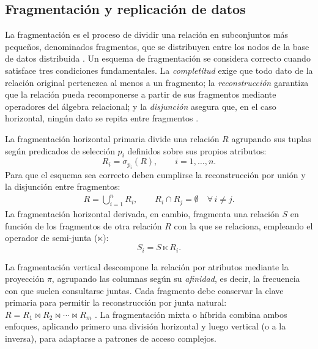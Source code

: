 \documentclass[10pt,a4paper]{article}
\begin{document}
\subsection{Fragmentación y replicación de datos}

La fragmentación es el proceso de dividir una relación en subconjuntos más pequeños,
denominados fragmentos, que se distribuyen entre los nodos de la base de datos
distribuida \cite{ozsu2020}. Un esquema de fragmentación se considera correcto cuando
satisface tres condiciones fundamentales. La \emph{completitud} exige que todo dato de
la relación original pertenezca al menos a un fragmento; la \emph{reconstrucción}
garantiza que la relación pueda recomponerse a partir de sus fragmentos mediante
operadores del álgebra relacional; y la \emph{disjunción} asegura que, en el caso
horizontal, ningún dato se repita entre fragmentos \cite{ozsu2020,kleppmann2017}.

La fragmentación horizontal primaria divide una relación $R$ agrupando sus tuplas según
predicados de selección $p_i$ definidos sobre sus propios atributos:
\begin{equation}
R_i = \sigma_{p_i}(R), \qquad i = 1, \dots, n.
\end{equation}
Para que el esquema sea correcto deben cumplirse la reconstrucción por unión y la
disjunción entre fragmentos:
\begin{align}
R = \bigcup_{i=1}^{n} R_i, \qquad R_i \cap R_j = \emptyset \quad \forall\, i \neq j.
\end{align}
La fragmentación horizontal derivada, en cambio, fragmenta una relación $S$ en función
de los fragmentos de otra relación $R$ con la que se relaciona, empleando el operador
de semi-junta ($\ltimes$):
\begin{equation}
S_i = S \ltimes R_i.
\end{equation}

La fragmentación vertical descompone la relación por atributos mediante la proyección
$\pi$, agrupando las columnas según su \emph{afinidad}, es decir, la frecuencia con que
suelen consultarse juntas. Cada fragmento debe conservar la clave primaria para permitir
la reconstrucción por junta natural: $R = R_1 \bowtie R_2 \bowtie \cdots \bowtie R_m$
\cite{ozsu2020}. La fragmentación mixta o híbrida combina ambos enfoques, aplicando
primero una división horizontal y luego vertical (o a la inversa), para adaptarse a
patrones de acceso complejos.
\end{document}

